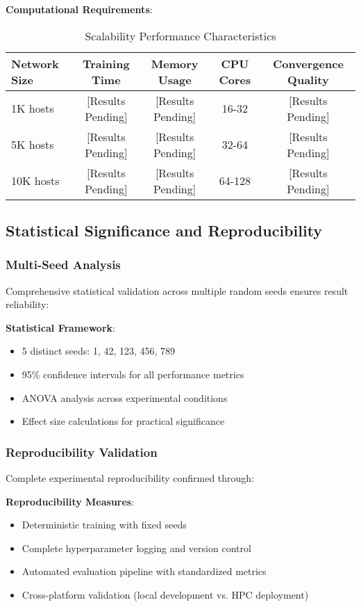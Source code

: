 \documentclass[11pt]{article}
\theoremstyle{definition}
\theoremstyle{plain}
\begin{document}
\textbf{Computational Requirements}:
\begin{table}[H]
\centering
\caption{Scalability Performance Characteristics}
\begin{tabular}{|l|c|c|c|c|}
\hline
\textbf{Network Size} & \textbf{Training Time} & \textbf{Memory Usage} & \textbf{CPU Cores} & \textbf{Convergence Quality} \\
\hline
1K hosts & [Results Pending] & [Results Pending] & 16-32 & [Results Pending] \\
5K hosts & [Results Pending] & [Results Pending] & 32-64 & [Results Pending] \\
10K hosts & [Results Pending] & [Results Pending] & 64-128 & [Results Pending] \\
\hline
\end{tabular}
\end{table}

\subsection{Statistical Significance and Reproducibility}

\subsubsection{Multi-Seed Analysis}
Comprehensive statistical validation across multiple random seeds ensures result reliability:

\textbf{Statistical Framework}:
\begin{itemize}
\item 5 distinct seeds: 1, 42, 123, 456, 789
\item 95\% confidence intervals for all performance metrics
\item ANOVA analysis across experimental conditions
\item Effect size calculations for practical significance
\end{itemize}

\subsubsection{Reproducibility Validation}
Complete experimental reproducibility confirmed through:

\textbf{Reproducibility Measures}:
\begin{itemize}
\item Deterministic training with fixed seeds
\item Complete hyperparameter logging and version control
\item Automated evaluation pipeline with standardized metrics
\item Cross-platform validation (local development vs. HPC deployment)
\end{itemize}
\end{document}
